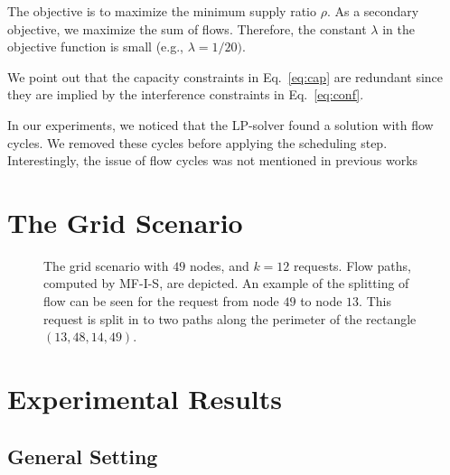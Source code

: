 \documentclass[12pt]{article}
\newenvironment{proof sketch}[1]{\noindent {\emph{Proof sketch of #1:}}}{\hfill \qed}
\newcommand{\algA}{\textsc{MF-I-S}}
\begin{document}
The objective is to maximize the minimum supply ratio $\rho$.  As a
secondary objective, we maximize the sum of flows.
Therefore, the constant $\lambda$ in the objective function is small
(e.g., $\lambda=1/20)$.

We point out that the capacity constraints in Eq.~\ref{eq:cap} are
redundant since they are implied by the interference constraints in
Eq.~\ref{eq:conf}.

In our experiments, we noticed that the LP-solver found a solution
with flow cycles. We removed these cycles before applying the
scheduling step.  Interestingly, the issue of flow cycles was not
mentioned in previous
works~\cite{alicherry2005joint11,buragohain2007improved}



\section{The Grid Scenario}\label{sec:figs}
\begin{figure}[H]
      \centering
        \caption{The grid scenario with $49$ nodes, and $k=12$
          requests.  Flow paths, computed by \algA, are depicted.  An
          example of the splitting of flow can be seen for the request
          from node $49$ to node $13$. This request is split in to
          two paths along the perimeter of the rectangle
          $(13,48,14,49)$.}
      \label{fig:big6}\label{fig:scenario grid}
     \end{figure}

\section{Experimental Results}\label{sec:exres}
\subsection{General Setting}\label{sec:exp}
\end{document}
